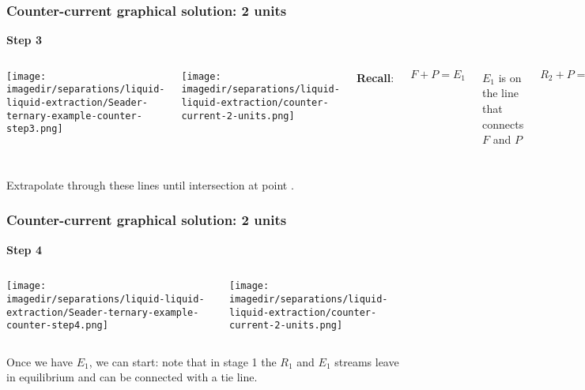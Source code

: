\begin{frame}\frametitle{Counter-current graphical solution: 2 units}
	\textbf{Step 3}
	\begin{columns}[t]
			\begin{center}
				\texttt{[image: \\imagedir/separations/liquid-liquid-extraction/Seader-ternary-example-counter-step3.png]}
			\end{center}
			\begin{center}
				\texttt{[image: \\imagedir/separations/liquid-liquid-extraction/counter-current-2-units.png]}
			\end{center}
			\textbf{Recall}: 
			
			\vspace{-10pt}
			\[	F + P = E_1 \]
			
			\vspace{-12pt}
			{\color{myOrange}\tiny$E_1$ is on the line that connects $F$ and $P$}
			
			\[	R_2 + P = S \]
			
			\vspace{-12pt}
			{\color{myOrange}\tiny$S$ is on the line that connects $R_2$ and $P$}
	\end{columns}
	\begin{exampleblock}{}
		Extrapolate through these lines until intersection at point {\color{myGreen}{$P$}}.
	\end{exampleblock}	
\end{frame}

\begin{frame}\frametitle{Counter-current graphical solution: 2 units}
	\textbf{Step 4}
	\begin{columns}[t]
			\begin{center}
				\texttt{[image: \\imagedir/separations/liquid-liquid-extraction/Seader-ternary-example-counter-step4.png]}
			\end{center}
			\begin{center}
				\texttt{[image: \\imagedir/separations/liquid-liquid-extraction/counter-current-2-units.png]}
			\end{center}
	\end{columns}
	\vspace{12pt}
	Once we have $E_1$, we can start: note that in stage 1 the $R_1$ and $E_1$ streams leave in equilibrium and can be connected with a {\color{myOrange}tie line}.
	\vfill
\end{frame}

